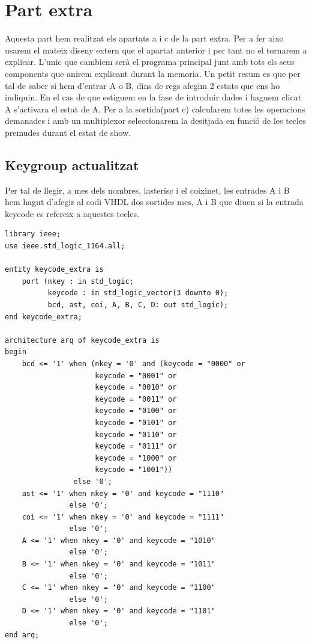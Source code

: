 \documentclass[12pt, a4papre]{article}
\begin{document}
	\newpage
	
	\section{Part extra}
	
	Aquesta part hem realitzat els apartats a i c de la part extra. Per a fer aixo usarem el mateix diseny extern que el apartat anterior i per tant no el tornarem a explicar. L'unic que cambiem serà el programa principal junt amb tots els seus components que anirem explicant durant la memoria. Un petit resum es que per tal de saber si hem d'entrar A o B, dins de regs afegim 2 estats que ens ho indiquin. En el cas de que estiguem en la fase de introduir dades i haguem clicat A s'activara el estat de A. Per a la sortida(part c) calcularem totes les operacions demanades i amb un multiplexor seleccionarem la desitjada en funció de les tecles premudes durant el estat de show.
	
	\subsection{Keygroup actualitzat}
	
	Per tal de llegir, a mes dels nombres, lasterisc i el coixinet, les entrades A i B hem hagut d'afegir al codi VHDL dos sortides mes, A i B que diuen si la entrada keycode es refereix a aquestes tecles.
	\begin{lstlisting}[style=vhdl, frame=single, basicstyle=\tiny]
library ieee;
use ieee.std_logic_1164.all;

entity keycode_extra is
	port (nkey : in std_logic;
		  keycode : in std_logic_vector(3 downto 0);
		  bcd, ast, coi, A, B, C, D: out std_logic);
end keycode_extra;

architecture arq of keycode_extra is
begin
	bcd <= '1' when (nkey = '0' and (keycode = "0000" or
					 keycode = "0001" or
					 keycode = "0010" or
					 keycode = "0011" or
					 keycode = "0100" or
					 keycode = "0101" or
					 keycode = "0110" or
					 keycode = "0111" or
					 keycode = "1000" or
					 keycode = "1001"))
				else '0';
	ast <= '1' when nkey = '0' and keycode = "1110"
			   else '0';
	coi <= '1' when nkey = '0' and keycode = "1111"
			   else '0';
	A <= '1' when nkey = '0' and keycode = "1010"
			   else '0';
	B <= '1' when nkey = '0' and keycode = "1011"
			   else '0';
	C <= '1' when nkey = '0' and keycode = "1100"
			   else '0';
	D <= '1' when nkey = '0' and keycode = "1101"
			   else '0';
end arq;
\end{lstlisting}
\end{document}
